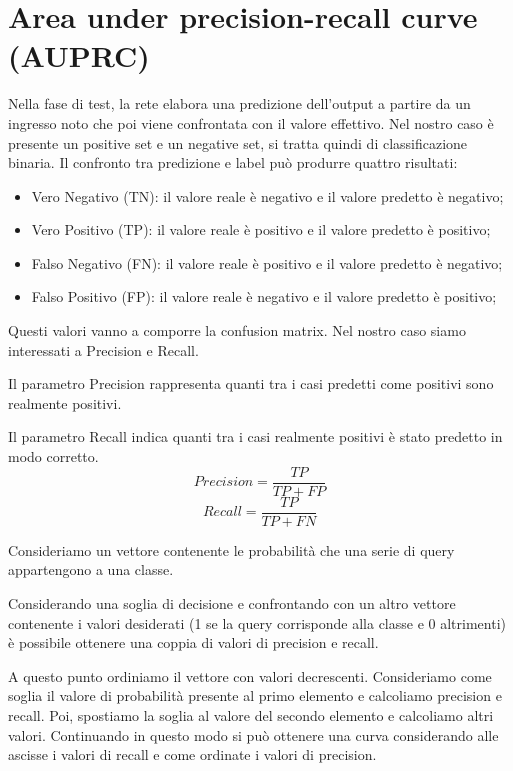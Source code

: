 \documentclass[12pt,a4paper,titlepage]{article}
\begin{document}
\section{Area under precision-recall curve (AUPRC)}
Nella fase di test, la rete elabora una predizione dell'output a partire da un ingresso noto che poi viene confrontata con il valore effettivo.
Nel nostro caso è presente un positive set e un negative set, si tratta quindi di classificazione binaria.
Il confronto tra predizione e label può produrre quattro risultati:
\begin{itemize}
	\item Vero Negativo (TN): il valore reale è negativo e il valore predetto è negativo;
	\item Vero Positivo (TP): il valore reale è positivo e il valore predetto	è positivo;
	\item Falso Negativo (FN): il valore reale è positivo e il valore predetto è negativo;
	\item Falso Positivo (FP): il valore reale è negativo e il valore predetto	è positivo;
\end{itemize}
Questi valori vanno a comporre la confusion matrix.
Nel nostro caso siamo interessati a Precision e Recall.

Il parametro Precision rappresenta quanti tra i casi predetti come positivi sono realmente positivi.

Il parametro Recall indica quanti tra i casi realmente positivi è stato predetto in modo corretto.
\begin{equation}
Precision=\frac{TP}{TP+FP}
\end{equation}
\begin{equation}
Recall=\frac{TP}{TP+FN}
\end{equation}

Consideriamo un vettore contenente le probabilità che una serie di query appartengono a una classe.

Considerando una soglia di decisione e confrontando con un altro vettore contenente i valori desiderati (1 se la query corrisponde alla classe e 0 altrimenti) è possibile ottenere una coppia di valori di precision e recall.

A questo punto ordiniamo il vettore con valori decrescenti.
Consideriamo come soglia il valore di probabilità presente al primo elemento e calcoliamo precision e recall.
Poi, spostiamo la soglia al valore del secondo elemento e calcoliamo altri valori.
Continuando in questo modo si può ottenere una curva considerando alle ascisse i valori di recall e come ordinate i valori di precision.
\end{document}
